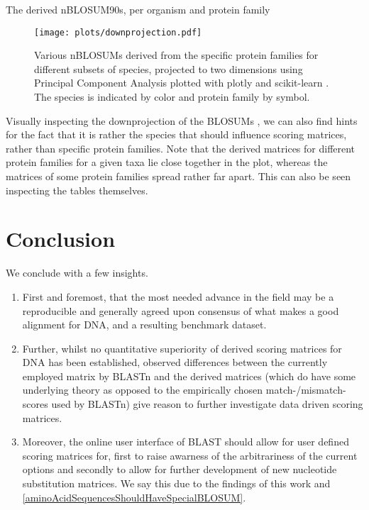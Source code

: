 \documentclass{article}
\begin{document}
	\begin{table}
	
	\caption{The derived nBLOSUM90s, per organism and protein family}
	\end{table}
\onecolumn
\pagebreak

\begin{figure}[!htp]
		\centering
		\texttt{[image: plots/downprojection.pdf]}
		\caption{Various nBLOSUMs derived from the specific protein
		families for different subsets of species, projected to two
		dimensions using Principal Component Analysis
	\cite{leverPrincipalComponentAnalysis2017} plotted with plotly
\cite{plotly} and scikit-learn \cite{scikit-learn}. The species is indicated
by color and protein family by symbol.}
	\end{figure}

Visually inspecting the downprojection of the BLOSUMs , we can also find
hints for the fact that it is rather the species that should influence scoring
matrices, rather than specific protein families. Note that the derived matrices
for different protein families for a given taxa lie close together in the plot,
whereas the matrices of some protein families spread rather far apart. This can also be
seen inspecting the tables themselves.

\section{Conclusion}
We conclude with a few insights.
\begin{enumerate} 
	\item First and foremost, that the most 
needed advance in the field may be a reproducible and generally agreed upon
consensus of what makes a good alignment for DNA, and a resulting benchmark
dataset.

	\item Further, whilst no quantitative superiority of derived scoring matrices for DNA
has been established, observed differences between the currently employed matrix by BLASTn and the derived matrices (which do have some underlying theory as
opposed to the empirically chosen match-/mismatch-scores used by BLASTn) give
reason to further investigate data driven scoring matrices. 

\item Moreover, the
online user interface of BLAST should allow for user defined scoring matrices
for, first to raise awarness of the arbitrariness of the current options and
secondly to allow for further development of new nucleotide substitution
matrices. We say this due to the findings of this work and \ref{aminoAcidSequencesShouldHaveSpecialBLOSUM}.

\end{enumerate}

\pagebreak

\nocite{reback2020pandas}
\printbibliography
\end{document}
